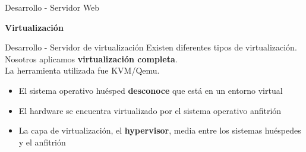 \begin{frame}{Desarrollo - Servidor Web}
    \vspace{0cm}
    \begin{figure}[ht]
       \centering
    \end{figure}

\end{frame}


\begin{frame}
    \Huge
    \centering
    \textbf{Virtualización}

\end{frame}


\begin{frame}{Desarrollo - Servidor de virtualización}
    \vspace{0cm}
    Existen diferentes tipos de virtualización. Nosotros aplicamos \textbf{virtualización completa}. 
    \\
    La herramienta utilizada fue KVM/Qemu.
    \begin{itemize}
        \item El sistema operativo huésped \textbf{desconoce} que está en un entorno virtual
        \item El hardware se encuentra virtualizado por el sistema operativo anfitrión
        \item La capa de virtualización, el \textbf{hypervisor}, media entre los sistemas huéspedes y el anfitrión
    \end{itemize}

\end{frame}


